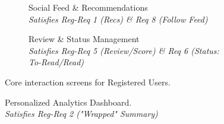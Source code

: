 \begin{figure}[H]
    \centering
    \begin{subfigure}[b]{0.45\textwidth}
        \centering
        \caption{Social Feed \& Recommendations \\ \textit{Satisfies Reg-Req 1 (Recs) \& Req 8 (Follow Feed)}}
        \label{fig:mockup_reg_feed}
    \end{subfigure}
    \hfill
    \begin{subfigure}[b]{0.45\textwidth}
        \centering
        \caption{Review \& Status Management \\ \textit{Satisfies Reg-Req 5 (Review/Score) \& Req 6 (Status: To-Read/Read)}}
        \label{fig:mockup_reg_action}
    \end{subfigure}
    \caption{Core interaction screens for Registered Users.}
    \label{fig:mockup_reg_core}
\end{figure}

\begin{figure}[H]
    \centering
    \caption{Personalized Analytics Dashboard. \\ \textit{Satisfies Reg-Req 2 ("Wrapped" Summary)}}
    \label{fig:mockup_wrapped}
\end{figure}



